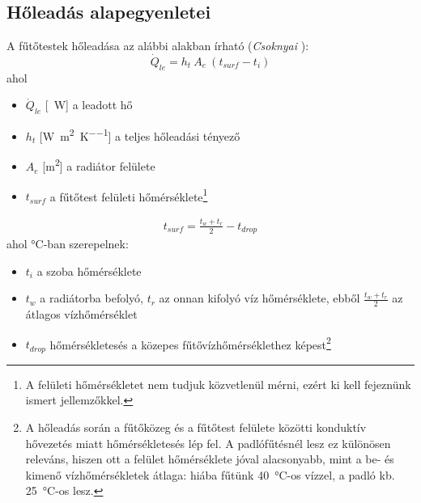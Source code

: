 \subsection{Hőleadás alapegyenletei}
A fűtőtestek hőleadása az alábbi alakban írható (\textit{Csoknyai} \cite[358.~o.]{Herz}):
\begin{equation} \label{eq_holeadas}
\dot Q_{le} = h_t ~ A_e ~ (t_{surf} - t_i)
\end{equation}
ahol
\begin{itemize}[itemsep=6pt,topsep=0pt,parsep=0pt,partopsep=0pt]
\item[] $\dot{Q}_{le}$ [\SI{}{\watt}] a leadott hő
\item[] $h_t$ [\si[per-mode = fraction]{\watt\per\meter\squared\per\kelvin}] a teljes hőleadási tényező %
\item[] $A_e$ [\si{\metre\squared}] a radiátor felülete
\item[] $t_{surf}$ a fűtőtest felületi hőmérséklete\footnote{A felületi hőmérsékletet nem tudjuk közvetlenül mérni, ezért ki kell fejeznünk ismert jellemzőkkel.}
\end{itemize}
\begin{equation} \label{eq_termeszeteshk_359}
\begin{aligned}
t_{surf} = \frac{t_w+t_r}{2} -t_{drop}
\end{aligned}
\end{equation}
ahol \si{\celsius}-ban szerepelnek:
\begin{itemize}[itemsep=6pt,topsep=0pt,parsep=0pt,partopsep=0pt]
	\item[] $t_i$ a szoba hőmérséklete
	\item[] $t_w$ a radiátorba befolyó, $t_r$ az onnan kifolyó víz hőmérséklete, ebből $\frac{t_w+t_r}{2}$ az átlagos vízhőmérséklet
	\item[] $t_{drop}$ hőmérsékletesés a közepes fűtővízhőmérséklethez képest\footnote{A hőleadás során a fűtőközeg és a fűtőtest felülete közötti konduktív hővezetés miatt hőmérsékletesés lép fel. A padlófűtésnél lesz ez különösen releváns, hiszen ott a felület hőmérséklete jóval alacsonyabb, mint a be- és kimenő vízhőmérsékletek átlaga: hiába fűtünk \SI{40}{\celsius}-os vízzel, a padló kb. \SI{25}{\celsius}-os lesz.}
\end{itemize}
%
%
%
%
